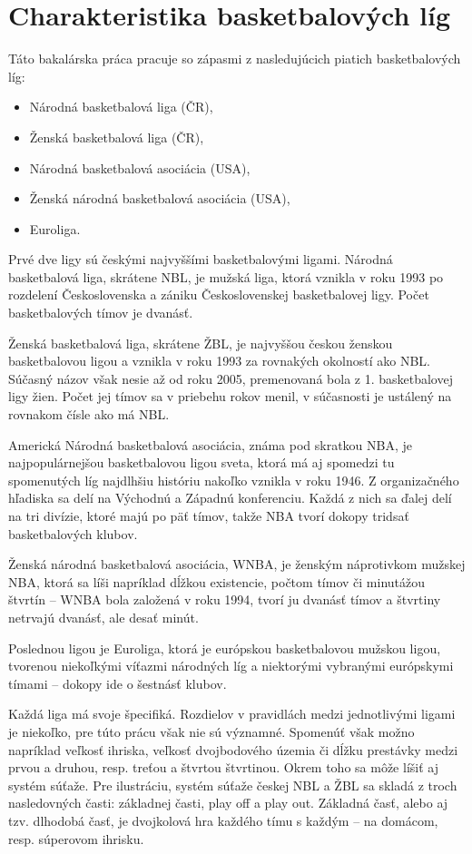 \documentclass[
  digital, %
  twoside, %
  notable,   %
  lof,     %
  lot,     %
]{fithesis3}
\begin{document}
		\section{Charakteristika basketbalových líg}
		Táto bakalárska práca pracuje so zápasmi z nasledujúcich piatich basketbalových líg:
		\begin{itemize}
		\item Národná basketbalová liga (ČR),
		\item Ženská basketbalová liga (ČR),
		\item Národná basketbalová asociácia (USA),
		\item Ženská národná basketbalová asociácia (USA),
		\item Euroliga.
		\end{itemize}
	
		Prvé dve ligy sú českými najvyššími basketbalovými ligami. Národná basketbalová liga, skrátene NBL, je mužská liga, ktorá vznikla v roku 1993 po rozdelení Československa a zániku Československej basketbalovej ligy. Počet basketbalových tímov je dvanásť.
		
		Ženská basketbalová liga, skrátene ŽBL, je najvyššou českou ženskou basketbalovou ligou a 
		vznikla v roku 1993 za rovnakých okolností ako NBL. Súčasný názov však nesie až od roku 2005, premenovaná bola z 1. basketbalovej ligy žien. Počet jej tímov sa v priebehu rokov menil, v súčasnosti je ustálený na rovnakom čísle ako má NBL.
		
		Americká Národná basketbalová asociácia, známa pod skratkou NBA, je najpopulárnejšou basketbalovou ligou sveta, ktorá má aj spomedzi tu spomenutých líg najdlhšiu históriu nakoľko vznikla v roku 1946. Z organizačného hľadiska sa delí na Východnú a Západnú konferenciu. Každá z nich sa ďalej delí na tri divízie, ktoré majú po päť tímov, takže NBA tvorí dokopy tridsať basketbalových klubov.
		
		Ženská národná basketbalová asociácia, WNBA, je ženským náprotivkom mužskej NBA, ktorá sa líši napríklad dĺžkou existencie, počtom tímov či minutážou štvrtín – WNBA bola založená v roku 1994, tvorí ju dvanásť tímov a štvrtiny netrvajú dvanásť, ale desať minút.
		
		Poslednou ligou je Euroliga, ktorá je európskou basketbalovou mužskou ligou, tvorenou niekoľkými víťazmi národných líg a niektorými vybranými európskymi tímami – dokopy ide o šestnásť klubov. 
		
		Každá liga má svoje špecifiká. Rozdielov v pravidlách medzi jednotlivými ligami je niekoľko, pre túto prácu však nie sú významné. Spomenúť však možno napríklad veľkosť ihriska, veľkosť dvojbodového územia či dĺžku prestávky medzi prvou a druhou, resp. treťou a štvrtou štvrtinou. Okrem toho sa môže líšiť aj systém súťaže. Pre ilustráciu, systém súťaže českej NBL a ŽBL sa skladá z troch nasledovných časti: základnej časti, play off a play out. Základná časť, alebo aj tzv. dlhodobá časť, je dvojkolová hra každého tímu s každým – na domácom, resp. súperovom ihrisku. 
		
\end{document}
